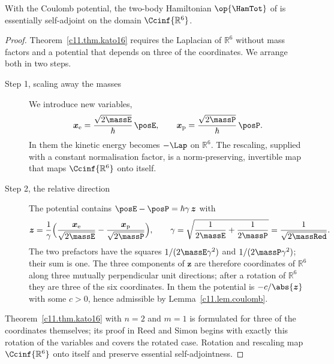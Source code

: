 \begin{fundament}
  \begin{proposition}\label{c11.prop.zweikoerper}
    With the Coulomb potential, the two-body Hamiltonian $\op{\HamTot}$ of  is
    essentially self-adjoint on the domain $\Ccinf{\mathbb{R}^6}$.
  \end{proposition}
  \begin{proof}
    Theorem~\ref{c11.thm.kato16} requires the Laplacian of $\mathbb{R}^6$ without mass
    factors and a potential that depends on three of the coordinates. We arrange both in
    two steps.
    \begin{description}
      \item[Step 1, scaling away the masses] We introduce new variables,
        \begin{equation*}
          \boldsymbol{x}_{\mathrm{e}} = \frac{\sqrt{2\massE}}{\hbar}\,\posE,
          \qquad
          \boldsymbol{x}_{\mathrm{p}} = \frac{\sqrt{2\massP}}{\hbar}\,\posP .
        \end{equation*}
        In them the kinetic energy becomes $-\Lap$ on $\mathbb{R}^6$. The rescaling, supplied with a constant
        normalisation factor, is a norm-preserving, invertible map that maps
        $\Ccinf{\mathbb{R}^6}$ onto itself.
      \item[Step 2, the relative direction] The potential contains
        $\posE - \posP = \hbar\gamma\,\boldsymbol{z}$ with
        \begin{equation}\label{c11.eq.drehung}
          \boldsymbol{z} = \frac{1}{\gamma}\Bigl(
            \frac{\boldsymbol{x}_{\mathrm{e}}}{\sqrt{2\massE}}
            - \frac{\boldsymbol{x}_{\mathrm{p}}}{\sqrt{2\massP}}\Bigr),
          \qquad
          \gamma = \sqrt{\frac{1}{2\massE} + \frac{1}{2\massP}}
                 = \frac{1}{\sqrt{2\massRed}} .
        \end{equation}
        The two prefactors have the squares $1/(2\massE\gamma^2)$ and
        $1/(2\massP\gamma^2)$; their sum is one. The three components of
        $\boldsymbol{z}$ are therefore coordinates of $\mathbb{R}^6$ along three
        mutually perpendicular unit directions; after a rotation of $\mathbb{R}^6$ they
        are three of the six coordinates. In them the potential is
        $-c/\abs{\boldsymbol{z}}$ with some $c > 0$, hence admissible by
        Lemma~\ref{c11.lem.coulomb}.
    \end{description}
    Theorem~\ref{c11.thm.kato16} with $n = 2$ and $m = 1$ is formulated for three of the
    coordinates themselves; its proof in Reed and Simon begins with exactly this
    rotation of the variables and covers the rotated case. Rotation and rescaling map
    $\Ccinf{\mathbb{R}^6}$ onto itself and preserve essential self-adjointness.
  \end{proof}


\end{fundament}
